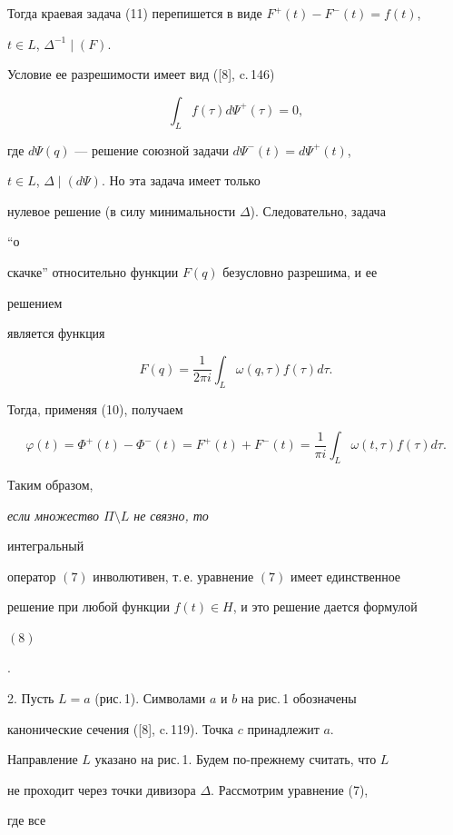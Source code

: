 Тогда краевая задача (11) перепишется в виде $F^+(t)-F^-(t)=f(t)$, 


$t\in L$, $\Delta^{-1}\mid(F)$. 


Условие ее разрешимости имеет вид ([8], c.\,146) 


$$ 


\int_L f(\tau)d\Psi^+(\tau)=0, 


$$ 


где $d\Psi(q)$ --- решение союзной задачи $d\Psi^-(t)=d\Psi^+(t)$, 


$t\in L$, $\Delta\mid(d\Psi)$. Но эта задача имеет только 


нулевое решение (в силу минимальности $\Delta$). Следовательно, задача 


``о 


скачке'' относительно функции $F(q)$ безусловно разрешима, и ее 


решением 


является функция 


$$ 


F(q)=\frac{1}{2\pi i}\int_L \omega(q,\tau)f(\tau)d\tau. 


$$ 


Тогда, применяя (10), получаем 


$$ 


\varphi(t)=\Phi^+(t)-\Phi^-(t)=F^+(t)+F^-(t)=\frac{1}{\pi i} 


\int_L \omega(t,\tau)f(\tau)d\tau. 


$$ 


Таким образом, {\it если множество $\Pi\setminus L$ не связно, то 


интегральный 


оператор $(7)$ инволютивен, т.\,е. уравнение $(7)$ имеет единственное 


решение при любой функции $f(t)\in H$, и это решение дается формулой 


$(8)$}. 


\medskip 


 


2. Пусть $L=a$ (рис.\,1). Символами $a$ и $b$ на рис.\,1 обозначены 


канонические сечения ([8], c.\,119). Точка $c$ принадлежит $a$. 


Направление $L$ указано на рис.\,1. Будем по-прежнему считать, что $L$ 


не проходит через точки дивизора $\Delta$. Рассмотрим уравнение (7), 


где все 


